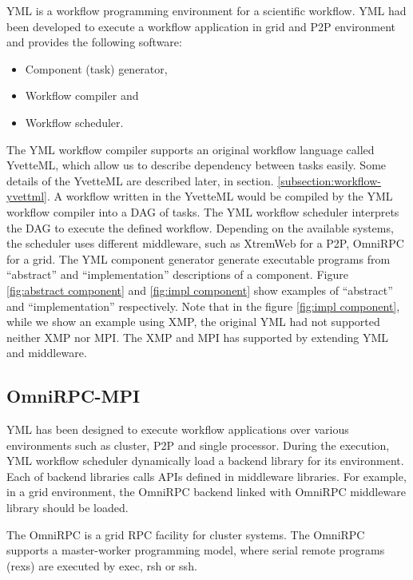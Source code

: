 \documentclass[graybox]{svmult}
\begin{document}
YML\cite{delannoy2004a, delannoy2006a, delannoy2006b} is a workflow programming environment for a scientific workflow. YML had been developed to execute a workflow application in grid and P2P environment and provides the following software:
\begin{itemize}
 \item Component (task) generator,  
 \item Workflow compiler and 
 \item Workflow scheduler.
\end{itemize}
The YML workflow compiler supports an original workflow language called YvetteML, which allow us to describe dependency between tasks easily. 
Some details of the YvetteML are described later, in section. \ref{subsection:workflow-yvettml}.
A workflow written in the YvetteML would be compiled by the YML workflow compiler into a DAG of tasks. The YML workflow scheduler interprets the DAG to execute the defined workflow. Depending on the available systems, the scheduler uses different middleware, such as XtremWeb for a P2P, OmniRPC\cite{sato2001a} for a grid. 
The YML component generator generate executable programs from ``abstract'' and ``implementation'' descriptions of a component. 
Figure \ref{fig:abstract component} and \ref{fig:impl component} show examples of ``abstract'' and ``implementation'' respectively. Note that in the figure \ref{fig:impl component}, while we show an example using XMP, the original YML had not supported neither XMP nor MPI. The XMP and MPI has supported by extending YML and middleware. 

\subsection{OmniRPC-MPI}
\label{subsection:omnirpc-mpi}

YML has been designed to execute workflow applications over various environments such as cluster, P2P and single processor.
During the execution, YML workflow scheduler dynamically load a backend library for its environment. 
Each of backend libraries calls APIs defined in middleware libraries. 
For example, in a grid environment, the OmniRPC backend linked with OmniRPC middleware library should be loaded. 

The OmniRPC \cite{sato2001a} is a grid RPC facility for cluster systems. The OmniRPC supports a master-worker programming model, where serial remote programs (rexs) are executed by exec, rsh or ssh. 
\end{document}
